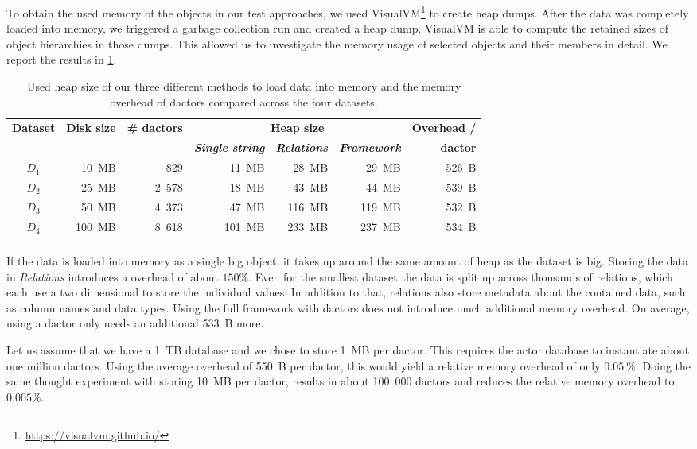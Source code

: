   To obtain the used memory of the objects in our test approaches, we used VisualVM\footnote{\url{https://visualvm.github.io/}} to create heap dumps.
  After the data was completely loaded into memory, we triggered a garbage collection run and created a heap dump.
  VisualVM is able to compute the retained sizes of object hierarchies in those dumps.
  This allowed us to investigate the memory usage of selected objects and their members in detail.
  We report the results in \cref{tab:memory_overhead}.
  
  \begin{table}
    \centering
    \begin{tabular}{crrrrrr}
      \toprule
      \multirow{2}{*}{\textbf{Dataset}} & \multirow{2}{*}{\textbf{Disk size}} & \multirow{2}{*}{\textbf{\# \Glspl{dactor}}} & \multicolumn{3}{c}{\textbf{Heap size}} & \textbf{Overhead /}\\
      & & & \textbf{\textit{Single string}} & \textbf{\textit{Relations}} & \textbf{\textit{Framework}} & \textbf{\gls{dactor}}\\
      \midrule
      $D_1$ &  10~MB &   829 &  11~MB &  28~MB &  29~MB & 526~B \\
      $D_2$ &  25~MB & 2~578 &  18~MB &  43~MB &  44~MB & 539~B \\
      $D_3$ &  50~MB & 4~373 &  47~MB & 116~MB & 119~MB & 532~B \\
      $D_4$ & 100~MB & 8~618 & 101~MB & 233~MB & 237~MB & 534~B \\
      \bottomrule& 
    \end{tabular}
    \caption{Used heap size of our three different methods to load data into memory and the memory overhead of \glspl{dactor} compared across the four datasets.}
    \label{tab:memory_overhead}
  \end{table}

  If the data is loaded into memory as a single big  object, it takes up around the same amount of heap as the dataset is big.
  Storing the data in \textit{Relations} introduces a overhead of about $150 \%$.
  Even for the smallest dataset the data is split up across thousands of relations, which each use a two dimensional  to store the individual values.
  In addition to that, relations also store metadata about the contained data, such as column names and data types.
  Using the full framework with \glspl{dactor} does not introduce much additional memory overhead.
  On average, using a \gls{dactor} only needs an additional 533~B more.
  
  Let us assume that we have a 1~TB database and we chose to store 1~MB per \gls{dactor}.
  This requires the actor database to instantiate about one million \glspl{dactor}.
  Using the average overhead of 550~B per \gls{dactor}, this would yield a relative memory overhead of only $0.05~\%$.
  Doing the same thought experiment with storing 10~MB per \gls{dactor}, results in about 100~000 \glspl{dactor} and reduces the relative memory overhead to $0.005 \%$.

